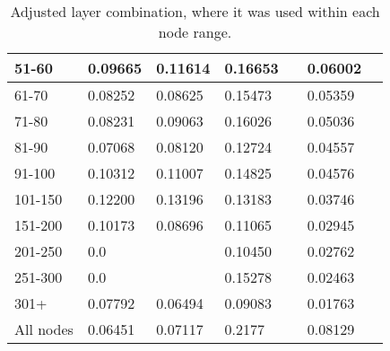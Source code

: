 \begin{table*}[h!]
\begin{tabular}{|l|l|l||l|l||l|l|}
        51-60     & 0.09665                                 & 0.11614                        & 0.16653                          &                  & 0.06002       &                  \\ \hline
        61-70     & 0.08252                                 & 0.08625                        & 0.15473                          &                  & 0.05359       &                  \\ \hline
        71-80     & 0.08231                                 & 0.09063                        & 0.16026                          &                  & 0.05036       &                  \\ \hline
        81-90     & 0.07068                                 & 0.08120                        & 0.12724                          &                  & 0.04557       &                  \\ \hline
        91-100    & 0.10312                                 & 0.11007                        & 0.14825                          &                  & 0.04576       &                  \\ \hline
        101-150   & 0.12200                                 & 0.13196                        & 0.13183                          &                  & 0.03746       &                  \\ \hline
        151-200   & 0.10173                                 & 0.08696                        & 0.11065                          &                  & 0.02945       &                  \\ \hline
        201-250   & 0.0                                     &                                & 0.10450                          &                  & 0.02762       &                  \\ \hline
        251-300   & 0.0                                     &                                & 0.15278                          &                  & 0.02463       &                  \\ \hline
        301+      & 0.07792                                 & 0.06494                        & 0.09083                          &                  & 0.01763       &                  \\ \hline
        All nodes & 0.06451                                 & 0.07117                        & 0.2177                           &                  & 0.08129       &                  \\ \hline
    \end{tabular}
    \caption{Adjusted layer combination, where it was used within each node range.}
    \label{tab:recall-adjusted-layer-bad-performance}
\end{table*}


